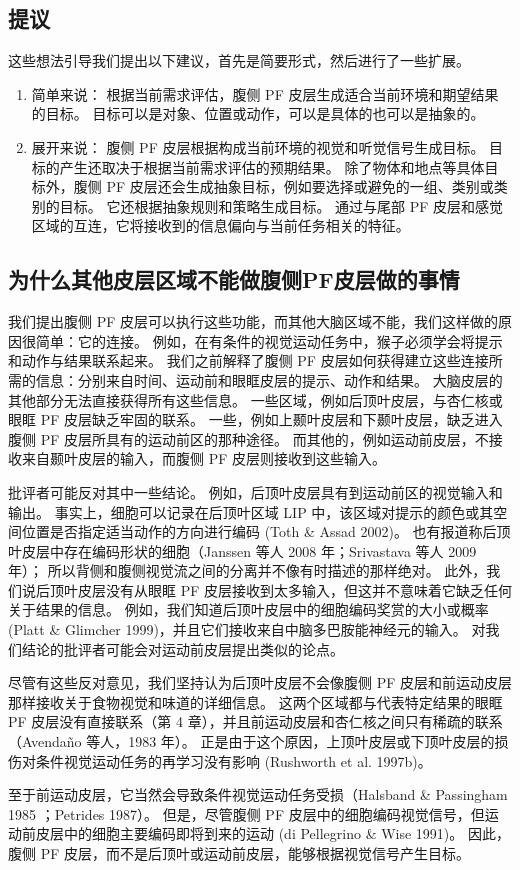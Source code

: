 \subsection{提议}
\par 
这些想法引导我们提出以下建议，首先是简要形式，然后进行了一些扩展。
\begin{enumerate}
\item 简单来说：
根据当前需求评估，腹侧 PF 皮层生成适合当前环境和期望结果的目标。 
目标可以是对象、位置或动作，可以是具体的也可以是抽象的。
\item  展开来说：
腹侧 PF 皮层根据构成当前环境的视觉和听觉信号生成目标。 
目标的产生还取决于根据当前需求评估的预期结果。 
除了物体和地点等具体目标外，腹侧 PF 皮层还会生成抽象目标，例如要选择或避免的一组、类别或类别的目标。 
它还根据抽象规则和策略生成目标。 通过与尾部 PF 皮层和感觉区域的互连，它将接收到的信息偏向与当前任务相关的特征。
\end{enumerate}
\subsection{为什么其他皮层区域不能做腹侧PF皮层做的事情}
\par 
我们提出腹侧 PF 皮层可以执行这些功能，而其他大脑区域不能，我们这样做的原因很简单：它的连接。 
例如，在有条件的视觉运动任务中，猴子必须学会将提示和动作与结果联系起来。 
我们之前解释了腹侧 PF 皮层如何获得建立这些连接所需的信息：分别来自时间、运动前和眼眶皮层的提示、动作和结果。 
大脑皮层的其他部分无法直接获得所有这些信息。 
一些区域，例如后顶叶皮层，与杏仁核或眼眶 PF 皮层缺乏牢固的联系。 
一些，例如上颞叶皮层和下颞叶皮层，缺乏进入腹侧 PF 皮层所具有的运动前区的那种途径。 
而其他的，例如运动前皮层，不接收来自颞叶皮层的输入，而腹侧 PF 皮层则接收到这些输入。
\par 
批评者可能反对其中一些结论。 
例如，后顶叶皮层具有到运动前区的视觉输入和输出。 
事实上，细胞可以记录在后顶叶区域 LIP 中，该区域对提示的颜色或其空间位置是否指定适当动作的方向进行编码 (Toth \& Assad 2002)。 
也有报道称后顶叶皮层中存在编码形状的细胞（Janssen 等人 2008 年；Srivastava 等人 2009 年）； 所以背侧和腹侧视觉流之间的分离并不像有时描述的那样绝对。
此外，我们说后顶叶皮层没有从眼眶 PF 皮层接收到太多输入，但这并不意味着它缺乏任何关于结果的信息。 
例如，我们知道后顶叶皮层中的细胞编码奖赏的大小或概率 (Platt \& Glimcher 1999)，并且它们接收来自中脑多巴胺能神经元的输入。
对我们结论的批评者可能会对运动前皮层提出类似的论点。
\par 
尽管有这些反对意见，我们坚持认为后顶叶皮层不会像腹侧 PF 皮层和前运动皮层那样接收关于食物视觉和味道的详细信息。 
这两个区域都与代表特定结果的眼眶 PF 皮层没有直接联系（第 4 章），并且前运动皮层和杏仁核之间只有稀疏的联系（Avendaño 等人，1983 年）。 
正是由于这个原因，上顶叶皮层或下顶叶皮层的损伤对条件视觉运动任务的再学习没有影响 (Rushworth et al. 1997b)。
\par 
至于前运动皮层，它当然会导致条件视觉运动任务受损（Halsband  \& Passingham 1985 ；Petrides 1987）。 
但是，尽管腹侧 PF 皮层中的细胞编码视觉信号，但运动前皮层中的细胞主要编码即将到来的运动 (di Pellegrino \& Wise 1991)。 
因此，腹侧 PF 皮层，而不是后顶叶或运动前皮层，能够根据视觉信号产生目标。
